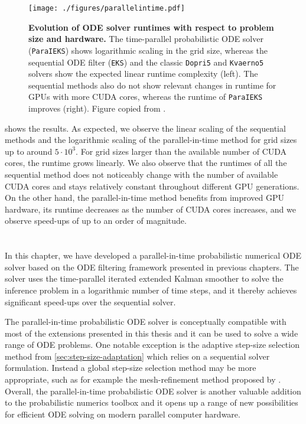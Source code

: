 \documentclass{mimosis}
\begin{document}
\begin{figure}[t]
\centering
\texttt{[image: ./figures/parallelintime.pdf]}
\caption{\label{fig:parallel:scaling}\textbf{Evolution of ODE solver runtimes with respect to problem size and hardware.} The time-parallel probabilistic ODE solver (\texttt{ParaIEKS}) shows logarithmic scaling in the grid size, whereas the sequential ODE filter (\texttt{EKS}) and the classic \texttt{Dopri5} and \texttt{Kvaerno5} solvers show the expected linear runtime complexity (left). The sequential methods also do not show relevant changes in runtime for GPUs with more CUDA cores, whereas the runtime of \texttt{ParaIEKS} improves (right). Figure copied from \protect\pint{}.}
\end{figure}

 shows the results.
As expected, we observe the linear scaling of the sequential methods and the logarithmic scaling of the parallel-in-time method for grid sizes up to around \(5\cdot10^{3}\).
For grid sizes larger than the available number of CUDA cores, the runtime grows linearly.
We also observe that the runtimes of all the sequential method does not noticeably change with the number of available CUDA cores and stays relatively constant throughout different GPU generations.
On the other hand, the parallel-in-time method benefits from improved GPU hardware, its runtime decreases as the number of CUDA cores increases, and we observe speed-ups of up to an order of magnitude.
\section{\wrapupsec{}}
\label{sec:orgd69c0f0}
In this chapter, we have developed a parallel-in-time probabilistic numerical ODE solver based on the ODE filtering framework presented in previous chapters.
The solver uses the time-parallel iterated extended Kalman smoother to solve the inference problem in a logarithmic number of time steps, and it thereby achieves significant speed-ups over the sequential solver.

The parallel-in-time probabilistic ODE solver is conceptually compatible with most of the extensions presented in this thesis and it can be used to solve a wide range of ODE problems.
One notable exception is the adaptive step-size selection method from \cref{sec:step-size-adaptation} which relies on a sequential solver formulation.
Instead a global step-size selection method may be more appropriate, such as for example the mesh-refinement method proposed by \textcite{kraemer202bvp}.
Overall, the parallel-in-time probabilistic ODE solver is another valuable addition to the probabilistic numerics toolbox and it opens up a range of new possibilities for efficient ODE solving on modern parallel computer hardware.
\end{document}
